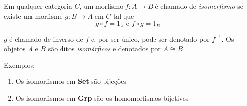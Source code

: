 \documentclass[../main.tex]{subfiles}
\begin{document}







\begin{definition}
    Em qualquer categoria $C$, um morfismo $f : A \to B$ é chamado de \emph{isomorfismo} se existe um morfismo $g : B \to A$ em $C$ tal que $$g \circ f = 1_A \text{ e } f \circ g = 1_B$$
\end{definition}

$g$ é chamado de inverso de $f$ e, por ser único, pode ser denotado por $f^{-1}$. Os objetos $A$ e $B$ são ditos \emph{isomórficos} e denotados por $A \cong B$

Exemplos:

\begin{enumerate}
    \item Os isomorfismos em \textbf{Set} são bijeções
    \item Os isomorfismos em \textbf{Grp} são os homomorfismos bijetivos
\end{enumerate}
\end{document}
